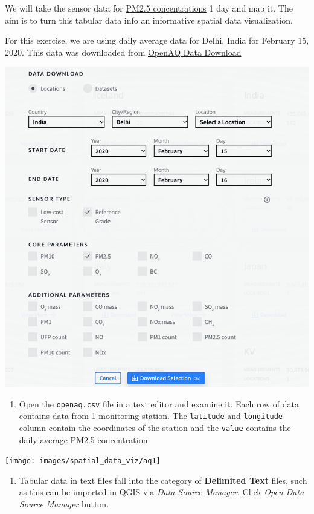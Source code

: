 \documentclass[
  12pt,
  a4paper]{article}
\providecommand{\tightlist}{%
  \setlength{\itemsep}{0pt}\setlength{\parskip}{0pt}}
\begin{document}
We will take the sensor data for
\href{https://blissair.com/what-is-pm-2-5.htm}{PM2.5 concentrations} 1
day and map it. The aim is to turn this tabular data info an informative
spatial data visualization.

For this exercise, we are using daily average data for Delhi, India for
February 15, 2020. This data was downloaded from
\href{https://openaq.org/\#/countries?_k=dmlk2k}{OpenAQ Data Download}

\begin{center}\includegraphics[width=0.75\linewidth]{images/spatial_data_viz/aq0} \end{center}

\begin{enumerate}
\def\labelenumi{\arabic{enumi}.}
\tightlist
\item
  Open the \texttt{openaq.csv} file in a text editor and examine it.
  Each row of data contains data from 1 monitoring station. The
  \texttt{latitude} and \texttt{longitude} column contain the
  coordinates of the station and the \texttt{value} contains the daily
  average PM2.5 concentration
\end{enumerate}

\begin{center}\texttt{[image: images/spatial\_data\_viz/aq1]} \end{center}

\begin{enumerate}
\def\labelenumi{\arabic{enumi}.}
\setcounter{enumi}{1}
\tightlist
\item
  Tabular data in text files fall into the category of \textbf{Delimited
  Text} files, such as this can be imported in QGIS via \emph{Data
  Source Manager}. Click \emph{Open Data Source Manager} button.
\end{enumerate}
\end{document}
